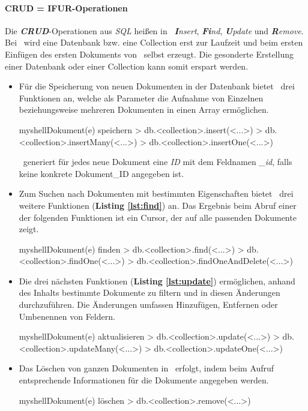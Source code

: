 \paragraph{CRUD = IFUR-Operationen}\label{ifur}
Die \textit{\textbf{CRUD}}-Operationen aus \textit{SQL} heißen in \mongo\ \textit{\textbf{I}nsert}, \textit{\textbf{Fi}nd}, \textit{\textbf{U}pdate} und \textit{\textbf{R}emove}. Bei \mongo\ wird eine Datenbank bzw. eine Collection erst zur Laufzeit und beim ersten Einfügen des ersten Dokuments von \mongo\ selbst erzeugt. Die gesonderte Erstellung einer Datenbank oder einer Collection kann somit erspart werden.
\begin{itemize}
\item Für die Speicherung von neuen Dokumenten in der Datenbank bietet \mongo\ drei Funktionen an, welche als Parameter die Aufnahme von Einzelnen beziehungsweise mehreren Dokumenten in einen Array ermöglichen. %
\begin{listingsboxShell}[label={lst:insert}]{myshell}{Dokument(e) speichern}
> db.<collection>.insert(<...>)
> db.<collection>.insertMany(<...>)
> db.<collection>.insertOne(<...>)
\end{listingsboxShell}
\mongo\ generiert für jedes neue Dokument eine \textit{ID} mit dem Feldnamen \textit{\_id}, falls keine konkrete Dokument\_ID angegeben ist.

\item Zum Suchen nach Dokumenten mit bestimmten Eigenschaften bietet \mongo\ drei weitere Funktionen (\textbf{Listing \ref{lst:find}}) an. Das Ergebnis beim Abruf einer der folgenden Funktionen ist ein Cursor, der auf alle passenden Dokumente zeigt.
\begin{listingsboxShell}[label={lst:find}]{myshell}{Dokument(e) finden}
> db.<collection>.find(<...>)
> db.<collection>.findOne(<...>)
> db.<collection>.findOneAndDelete(<...>)
\end{listingsboxShell}

\item Die drei nächsten Funktionen (\textbf{Listing \ref{lst:update}}) ermöglichen, anhand des Inhalts bestimmte Dokumente zu filtern und in diesen Änderungen durchzuführen. Die Änderungen umfassen Hinzufügen, Entfernen oder Umbenennen von Feldern.
\begin{listingsboxShell}[label={lst:update}]{myshell}{Dokument(e) aktualisieren}
> db.<collection>.update(<...>)
> db.<collection>.updateMany(<...>)
> db.<collection>.updateOne(<...>)
\end{listingsboxShell}

\item Das Löschen von ganzen Dokumenten in \mongo\ erfolgt, indem beim Aufruf entsprechende Informationen für die Dokumente angegeben werden.
\begin{listingsboxShell}[label={lst:remove}]{myshell}{Dokument(e) löschen}
> db.<collection>.remove(<...>)
\end{listingsboxShell}
\end{itemize}

